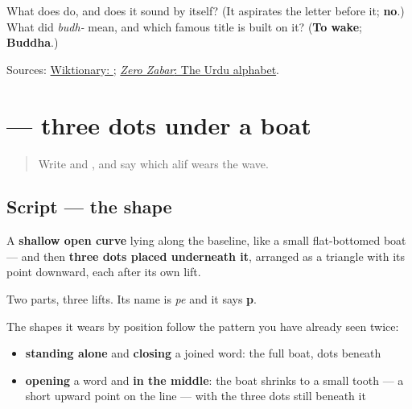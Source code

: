 \begin{tcolorbox}[breakable,colback=teal!4,colframe=teal!35!black,title={Before you move on}]
What does \textbf{} do, and does it sound by itself? (It aspirates the letter before it; \textbf{no}.) What did \emph{budh-} mean, and which famous title is built on it? (\textbf{To wake}; \textbf{Buddha}.)

Sources: \href{https://en.wiktionary.org/wiki/\%D8\%B3\%D9\%85\%D8\%AC\%DA\%BE\%D9\%86\%D8\%A7}{Wiktionary: }; \href{https://openbooks.library.northwestern.edu/zerozabar/chapter/the-urdu-alphabet/}{\emph{Zero Zabar}: The Urdu alphabet}.
\end{tcolorbox}
\section[\texorpdfstring{\ur{پ} (pe)}{پ (pe)}]{ — three dots under a boat}

\label{lesson:UR-W07-pe}



\begin{quote}
Write  and , and say which alif wears the wave.
\end{quote}

\subsection*{Script — the shape}

\begin{quote}
\end{quote}

A \textbf{shallow open curve} lying along the baseline, like a small flat-bottomed boat — and then \textbf{three dots placed underneath it}, arranged as a triangle with its point downward, each after its own lift.

Two parts, three lifts. Its name is \textbf{} \emph{pe} and it says \textbf{p}.

The shapes it wears by position follow the pattern you have already seen twice:

\begin{itemize}
\raggedright
  \item \textbf{standing alone} and \textbf{closing} a joined word: the full boat, dots beneath
  \item \textbf{opening} a word and \textbf{in the middle}: the boat shrinks to a small tooth — a short upward point on the line — with the three dots still beneath it
\end{itemize}

